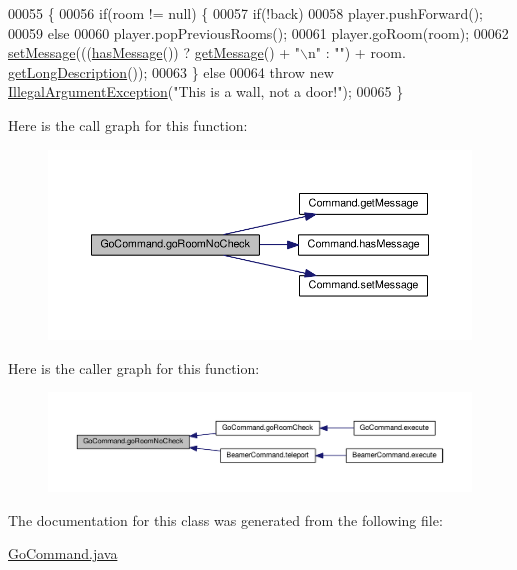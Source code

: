 \begin{DoxyCode}
00055                                                                                                          \{
00056         \textcolor{keywordflow}{if}(room != null) \{
00057             \textcolor{keywordflow}{if}(!back)
00058                 player.pushForward();
00059             \textcolor{keywordflow}{else}
00060                 player.popPreviousRooms();
00061             player.goRoom(room);
00062             \hyperlink{classCommand_a715709d8f0ab65879d79ad1725c96f17}{setMessage}(((\hyperlink{classCommand_a3d232d33894a20dc81b7627d84f14183}{hasMessage}()) ? \hyperlink{classCommand_ac3d4abebefb2aea0ce9757bf9c356882}{getMessage}() + \textcolor{stringliteral}{"\(\backslash\)n"} : \textcolor{stringliteral}{""}) + room.
      \hyperlink{classRoom_a23a25854d7544fb0b41190a4d6bd1322}{getLongDescription}());
00063         \} \textcolor{keywordflow}{else}
00064             \textcolor{keywordflow}{throw} \textcolor{keyword}{new} \hyperlink{classIllegalArgumentException}{IllegalArgumentException}(\textcolor{stringliteral}{"This is a wall, not a door!"});
00065     \}
\end{DoxyCode}


Here is the call graph for this function\-:
\nopagebreak
\begin{figure}[H]
\begin{center}
\leavevmode
\includegraphics[width=350pt]{classGoCommand_a3149bf695c19b78c39cfc4dadece7846_cgraph}
\end{center}
\end{figure}




Here is the caller graph for this function\-:
\nopagebreak
\begin{figure}[H]
\begin{center}
\leavevmode
\includegraphics[width=350pt]{classGoCommand_a3149bf695c19b78c39cfc4dadece7846_icgraph}
\end{center}
\end{figure}




The documentation for this class was generated from the following file\-:\begin{DoxyCompactItemize}
\item 
\hyperlink{GoCommand_8java}{Go\-Command.\-java}\end{DoxyCompactItemize}
